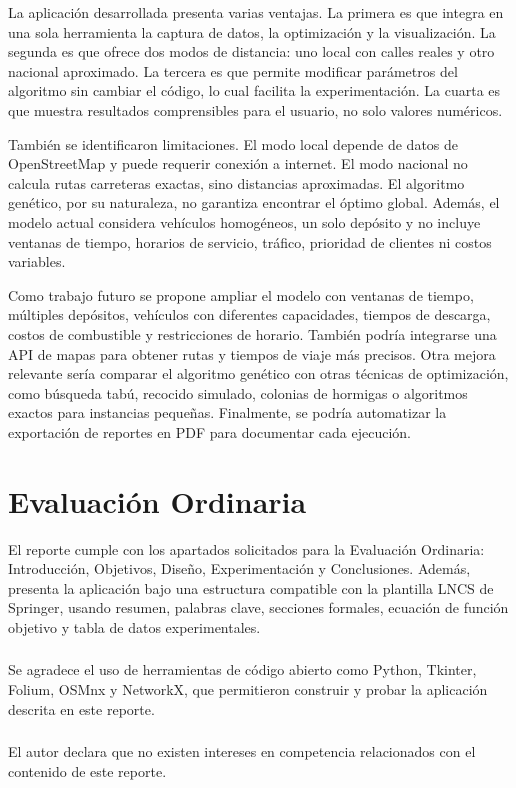 \documentclass[runningheads]{llncs}
\begin{document}
La aplicaci\'on desarrollada presenta varias ventajas. La primera es que integra
en una sola herramienta la captura de datos, la optimizaci\'on y la visualizaci\'on.
La segunda es que ofrece dos modos de distancia: uno local con calles reales y
otro nacional aproximado. La tercera es que permite modificar par\'ametros del
algoritmo sin cambiar el c\'odigo, lo cual facilita la experimentaci\'on. La cuarta
es que muestra resultados comprensibles para el usuario, no solo valores
num\'ericos.

Tambi\'en se identificaron limitaciones. El modo local depende de datos de
OpenStreetMap y puede requerir conexi\'on a internet. El modo nacional no calcula
rutas carreteras exactas, sino distancias aproximadas. El algoritmo gen\'etico,
por su naturaleza, no garantiza encontrar el \'optimo global. Adem\'as, el modelo
actual considera veh\'iculos homog\'eneos, un solo dep\'osito y no incluye ventanas
de tiempo, horarios de servicio, tr\'afico, prioridad de clientes ni costos
variables.

Como trabajo futuro se propone ampliar el modelo con ventanas de tiempo, m\'ultiples
dep\'ositos, veh\'iculos con diferentes capacidades, tiempos de descarga, costos de
combustible y restricciones de horario. Tambi\'en podr\'ia integrarse una API de
mapas para obtener rutas y tiempos de viaje m\'as precisos. Otra mejora relevante
ser\'ia comparar el algoritmo gen\'etico con otras t\'ecnicas de optimizaci\'on,
como b\'usqueda tab\'u, recocido simulado, colonias de hormigas o algoritmos
exactos para instancias peque\~nas. Finalmente, se podr\'ia automatizar la
exportaci\'on de reportes en PDF para documentar cada ejecuci\'on.

\section*{Evaluaci\'on Ordinaria}

El reporte cumple con los apartados solicitados para la Evaluaci\'on Ordinaria:
Introducci\'on, Objetivos, Dise\~no, Experimentaci\'on y Conclusiones. Adem\'as,
presenta la aplicaci\'on bajo una estructura compatible con la plantilla LNCS de
Springer, usando resumen, palabras clave, secciones formales, ecuaci\'on de
funci\'on objetivo y tabla de datos experimentales.

\begin{credits}
\subsubsection{\ackname} Se agradece el uso de herramientas de c\'odigo abierto
como Python, Tkinter, Folium, OSMnx y NetworkX, que permitieron construir y
probar la aplicaci\'on descrita en este reporte.

\subsubsection{\discintname}
El autor declara que no existen intereses en competencia relacionados con el
contenido de este reporte.
\end{credits}
\end{document}
